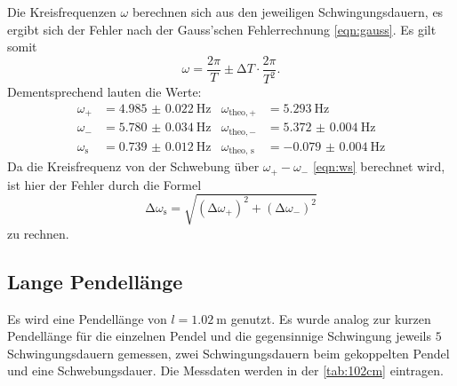   \noindent Die Kreisfrequenzen $\omega$ berechnen sich aus den jeweiligen Schwingungsdauern, es ergibt sich der Fehler nach der Gauss'schen Fehlerrechnung 
  \eqref{eqn:gauss}. Es gilt somit
  \begin{equation} \label{eqn:omega}
    \omega = \frac{2 \pi}{T} \pm \increment  T \cdot \frac{2 \pi}{T^2}. 
  \end{equation}
  Dementsprechend lauten die Werte: 
  \begin{align*}
    \omega_{+} &= \SI{4.985(22)}{\hertz} &         \omega_{\text{theo}, +} &= \SI{5.293}{\hertz}  \\
    \omega_{-} &= \SI{5.780(34)}{\hertz} &         \omega_{\text{theo}, -} &= \SI{5.372(4)}{\hertz} \\
    \omega_{\text{s}} &= \SI{0.739(12)}{\hertz} &  \omega_{\text{theo, s}} &= \SI{-0.079(4)}{\hertz} 
  \end{align*}
  Da die Kreisfrequenz von der Schwebung über $\omega_{+} - \omega_{-} $ \eqref{eqn:ws} berechnet wird, ist hier der Fehler durch die Formel 
  \begin{equation} \label{eqn:fehlerws}
    \increment \omega_{\text{s}} = \sqrt{ (\increment \omega_{+} )^2 + (\increment \omega_{-} )^2 }
  \end{equation}
  zu rechnen. 

\subsection{Lange Pendellänge}

  Es wird eine Pendellänge von $l = \SI{1.02}{\metre}$ genutzt. Es wurde analog zur kurzen Pendellänge für die einzelnen Pendel und die 
  gegensinnige Schwingung jeweils $5$ Schwingungsdauern gemessen, zwei Schwingungsdauern beim gekoppelten Pendel und eine Schwebungsdauer. 
  Die Messdaten werden in der \autoref{tab:102cm} eintragen. 


